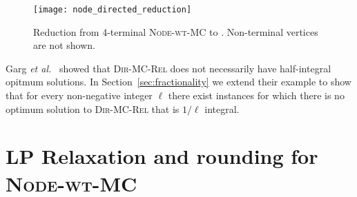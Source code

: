 \documentclass[11pt]{article}
\newcommand{\etal}{{\em et al.}~}
\def\MC{\textsc{Edge-wt-MC}\xspace}
\def\DirMC{\textsc{Dir-MC}\xspace}
\def\2DirMC{\text{$st$-Bi-Cut}\xspace}
\def\NodeMC{\textsc{Node-wt-MC}\xspace}
\def\DirMCRel{\textsc{Dir-MC-Rel}\xspace}
\def\NodeMC{\textsc{Node-wt-MC}\xspace}
\begin{document}
\iffalse
Given a \NodeMC instance with graph $G$ and set of terminals
$\{s_1,s_2,s_3,s_4\}$, figure \ref{fig:node_to_directed_reduction}
shows a reduction to \DirMC instance with graph $G'$ and terminals
$s,t$. For each non-terminal vertex $v$ in $V(G)$, we have two
terminals $v^-,v^+$ and an edge $(v^-,v^+)$ with weight $w_v$. For
each edge $(u,v) \in E(G)$ we have two new edges $(u^+,v^-)$ and
$(v^+,u^-)$ of infinite weight. We also have two new vertices $s,t$
and edges:
$(s,s_1),(s_1,s),(s_2,s),(s_2,t),(s,s_3),(t,s_3),(t,s_4),(s_4,t)$. Weights
of all of these edges are infinite. It is easy to argue that $C$ is a
feasible solution to \MC in G iff $\{(v^-,v^+) | v \in C\}$ is a
feasible solution to \NodeMC in $G'$. Infinite weight edges are never
picked in optimum solution for \NodeMC. Thus, minimum cut for \MC in
$G$ is of same value as the minimum cut for \NodeMC in $G'$.
\fi

\begin{figure}[htb]
\centering
\texttt{[image: node\_directed\_reduction]}
\caption{Reduction from 4-terminal \NodeMC to \2DirMC. Non-terminal
vertices are not shown.}
\label{fig:node_to_directed_reduction}
\end{figure}

Garg \etal \cite{GargVY04} showed that \DirMCRel does not necessarily
have half-integral opitmum solutions. In
Section~\ref{sec:fractionality} we extend their example to show that
for every non-negative integer $\ell$ there exist instances for which 
there is no optimum solution to \DirMCRel that is $1/\ell$ integral.

\section{LP Relaxation and rounding for \NodeMC}
\label{sec:node-mc}
\end{document}
